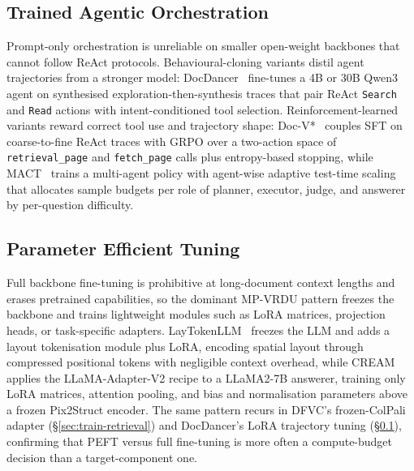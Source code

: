 \documentclass[11pt]{article}
\begin{document}

\subsection{Trained Agentic Orchestration}
\label{sec:train-orchestration}
Prompt-only orchestration is unreliable on smaller open-weight backbones that cannot follow ReAct protocols. Behavioural-cloning variants distil agent trajectories from a stronger model: DocDancer~\cite{zhang2026docdancer} fine-tunes a 4B or 30B Qwen3 agent on synthesised exploration-then-synthesis traces that pair ReAct \texttt{Search} and \texttt{Read} actions with intent-conditioned tool selection. Reinforcement-learned variants reward correct tool use and trajectory shape: Doc-V*~\cite{zheng2026docvstar} couples SFT on coarse-to-fine ReAct traces with GRPO over a two-action space of \texttt{retrieval\_page} and \texttt{fetch\_page} calls plus entropy-based stopping, while MACT~\cite{yu2025mact} trains a multi-agent policy with agent-wise adaptive test-time scaling that allocates sample budgets per role of planner, executor, judge, and answerer by per-question difficulty.

\subsection{Parameter Efficient Tuning}
\label{sec:train-peft}
Full backbone fine-tuning is prohibitive at long-document context lengths and erases pretrained capabilities, so the dominant MP-VRDU pattern freezes the backbone and trains lightweight modules such as LoRA matrices, projection heads, or task-specific adapters. LayTokenLLM~\cite{zhu2025laytokenllm} freezes the LLM and adds a layout tokenisation module plus LoRA, encoding spatial layout through compressed positional tokens with negligible context overhead, while CREAM~\cite{zhang2024cream} applies the LLaMA-Adapter-V2 recipe to a LLaMA2-7B answerer, training only LoRA matrices, attention pooling, and bias and normalisation parameters above a frozen Pix2Struct encoder. The same pattern recurs in DFVC's frozen-ColPali adapter (§\ref{sec:train-retrieval}) and DocDancer's LoRA trajectory tuning (§\ref{sec:train-orchestration}), confirming that PEFT versus full fine-tuning is more often a compute-budget decision than a target-component one.
\end{document}
